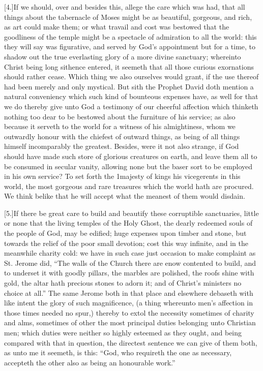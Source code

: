 [4.]If we should, over and besides this, allege the care which was had, that all things about the tabernacle of Moses might be as beautiful, gorgeous, and rich, as art could make them; or what travail and cost was bestowed that the goodliness of the temple might be a spectacle of admiration to all the world: this they will say was figurative, and served by God’s appointment but for a time, to shadow out the true everlasting glory of a more divine sanctuary; whereinto Christ being long sithence entered, it seemeth that all those curious exornations should rather cease. Which thing we also ourselves would grant, if the use thereof had been merely and only mystical. But sith the Prophet David doth mention a natural conveniency which such kind of bounteous expenses have, as well for that we do thereby give unto God a testimony of our cheerful affection which thinketh nothing too dear to be bestowed about the furniture of his service; as also because it serveth to the world for a witness of his almightiness, whom we outwardly honour with the chiefest of outward things, as being of all things himself incomparably the greatest. Besides, were it not also strange, if God should have made such store of glorious creatures on earth, and leave them all to be consumed in secular vanity, allowing none but the baser sort to be employed in his own service? To set forth the  1majesty of kings his vicegerents in this world, the most gorgeous and rare treasures which the world hath are procured.
 We think belike that he will accept what the meanest of them would disdain.

[5.]If there be great care to build and beautify these corruptible sanctuaries, little or none that the living temples of the Holy Ghost, the dearly redeemed souls of the people of God, may be edified; huge expenses upon timber and stone, but towards the relief of the poor small devotion; cost this way infinite, and in the meanwhile charity cold: we have in such case just occasion to make complaint as St. Jerome did, “The walls of the Church there are enow contented to build, and to underset it with goodly pillars, the marbles are polished, the roofs shine with gold, the altar hath precious stones to adorn it; and of Christ’s ministers no choice at all.” The same Jerome both in that place and elsewhere debaseth with like intent the glory of such magnificence, (a thing whereunto men’s affection in those times needed no spur,) thereby to extol the necessity sometimes of charity and alms, sometimes of other the most principal duties belonging unto Christian men; which duties were neither so highly esteemed as they ought, and being compared with that in  question, the directest sentence we can give of them both, as unto me it seemeth, is this:
 “God, who requireth the one as necessary, accepteth the other also as being an honourable work.”


